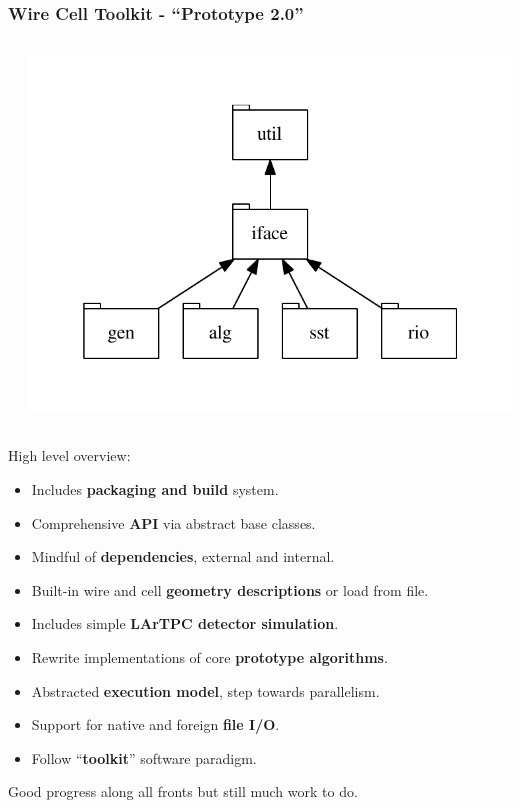 \documentclass[xcolor=dvipsnames]{beamer}
\begin{document}
\begin{frame}
  \frametitle{Wire Cell Toolkit - ``Prototype 2.0''}
  \begin{columns}
    \begin{column}{0.65\paperwidth}
    \end{column}
    \begin{column}{0.35\paperwidth}
      \vspace{-20mm}
      \includegraphics[width=\textwidth]{deps.pdf}      
    \end{column}
  \end{columns}

  \vspace{-15mm}

  High level overview:
  \begin{itemize}
  \item Includes \textbf{packaging and build} system.
  \item Comprehensive \textbf{API} via abstract base classes.
  \item Mindful of \textbf{dependencies}, external and internal.
  \item Built-in wire and cell \textbf{geometry descriptions} or load from file.
  \item Includes simple \textbf{LArTPC detector simulation}.
  \item Rewrite implementations of core \textbf{prototype algorithms}.
  \item Abstracted \textbf{execution model}, step towards parallelism.
  \item Support for native and foreign \textbf{file I/O}.
  \item Follow ``\textbf{toolkit}'' software paradigm.
  \end{itemize}

  \vfill

  Good progress along all fronts but still much work to do.

\end{frame}
\end{document}
